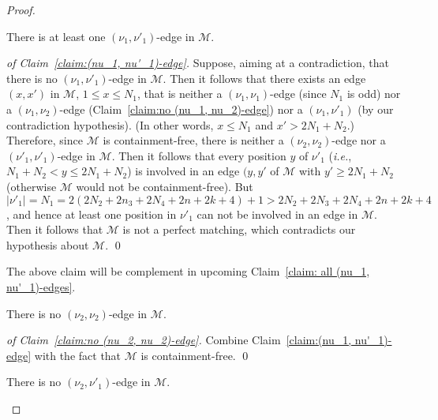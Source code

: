 \documentclass[a4paper]{llncs}
\begin{document}
\begin{proof}
  \begin{claim}
    \label{claim:(nu_1, nu'_1)-edge}
    There is at least one $(\nu_1, \nu'_1)$-edge in $\mathcal{M}$.
  \end{claim}

  \begin{proof}[of Claim~\ref{claim:(nu_1, nu'_1)-edge}]
    Suppose, aiming at a contradiction, that there is no
    $(\nu_1, \nu'_1)$-edge in $\mathcal{M}$.
    Then it follows that there exists an edge $(x, x')$ in $\mathcal{M}$,
    $1 \leq x \leq N_1$, that is neither a
    $(\nu_1, \nu_1)$-edge (since $N_1$ is odd)
    nor a $(\nu_1, \nu_2)$-edge (Claim~\ref{claim:no (nu_1, nu_2)-edge})
    nor a $(\nu_1, \nu'_1)$ (by our contradiction hypothesis).
    (In other words, $x \leq N_1$ and $x' > 2N_1 + N_2$.)
    Therefore, since $\mathcal{M}$ is containment-free,
    there is neither a $(\nu_2, \nu_2)$-edge nor a $(\nu'_1, \nu'_1)$-edge
    in $\mathcal{M}$.
    Then it follows that every position $y$ of $\nu'_1$
    (\emph{i.e.}, $N_1+N_2 < y \leq 2N_1+N_2$)
    is involved in an edge $(y, y'$ of $\mathcal{M}$ with $y' \geq 2N_1+N_2$
    (otherwise $\mathcal{M}$ would not be containment-free).
    But $|\nu'_1| = N_1 = 2(2N_2 + 2n_3 + 2N_4 + 2n + 2k + 4) + 1
    > 2N_2 + 2N_3 + 2N_4 + 2n + 2k + 4$, and hence at least one
    position in $\nu'_1$ can not be involved in an edge in $\mathcal{M}$.
    Then it follows that $\mathcal{M}$ is not a perfect matching,
    which contradicts our hypothesis about $\mathcal{M}$.
    \qed
  \end{proof}

  The above claim will be complement in upcoming Claim~\ref{claim: all (nu_1, nu'_1)-edges}.

  \begin{claim}
    \label{claim:no (nu_2, nu_2)-edge}
    There is no $(\nu_2, \nu_2)$-edge in $\mathcal{M}$.
  \end{claim}

  \begin{proof}[of Claim~\ref{claim:no (nu_2, nu_2)-edge}]
  Combine Claim~\ref{claim:(nu_1, nu'_1)-edge} with
  the fact that $\mathcal{M}$ is containment-free.
  \qed
  \end{proof}

  \begin{claim}
    \label{claim:no (nu_2, nu'_1)-edge}
    There is no $(\nu_2, \nu'_1)$-edge in $\mathcal{M}$.
  \end{claim}


\end{proof}
\end{document}
